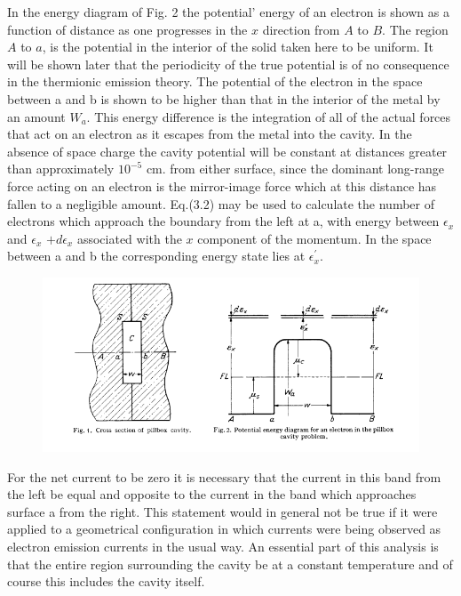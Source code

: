 \documentclass[11pt,a4paper]{article}
\begin{document}
	In the energy diagram of Fig. 2 the potential' energy of an electron is shown
	as a function of distance as one progresses in the $x$ direction from $A$ to $B$. The region $A$ to $a$, is the potential in the interior of the solid taken here to be uniform.
	It will be shown later that the periodicity of the true potential is of no consequence in the thermionic emission theory. The potential of the electron in the
	space between a and b is shown to be higher than that in the interior of the metal
	by an amount $W_a$. This energy difference is the integration of all of the actual
	forces that act on an electron as it escapes from the metal into the cavity. In
	the absence of space charge the cavity potential will be constant at distances
	greater than approximately $10^{-5}$ cm. from either surface, since the dominant
	long-range force acting on an electron is the mirror-image force which at this
	distance has fallen to a negligible amount. Eq.(3.2) may be used to calculate
	the number of electrons which approach the boundary from the left at a, with
	energy between $\epsilon_x$ and $\epsilon_x$ $ + d\epsilon_x$ associated with the $x$ component of the momentum. In the space between a and b the corresponding energy state lies at $\epsilon_x^{'}$.
	
	
	
	\begin{figure}[h]
		\centering
		\includegraphics[width=\textwidth]{fig1.png}
	\end{figure}
	
	
	
	For the net current to be zero it is necessary that the current in this band from
	the left be equal and opposite to the current in the band which approaches surface a from the right. This statement would in general not be true if it were
	applied to a geometrical configuration in which currents were being observed
	as electron emission currents in the usual way. An essential part of this analysis
	is that the entire region surrounding the cavity be at a constant temperature
	and of course this includes the cavity itself.
	
\end{document}
